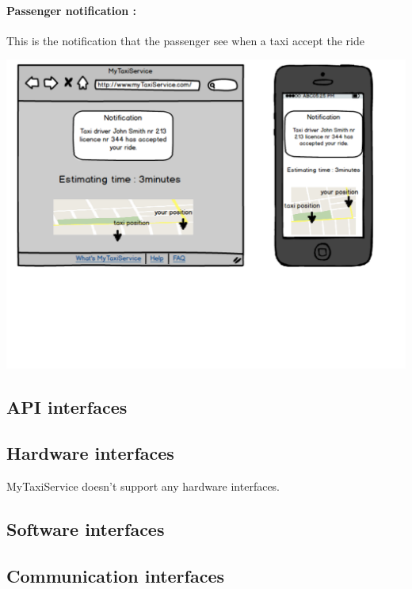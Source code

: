 \paragraph{Passenger notification :}
This is the notification that the passenger see when a taxi accept the ride
\begin{center}
	\includegraphics[width=\textwidth]{mockup/PassengerNotification.pdf}
\end{center}

\subsection{API interfaces}
\subsection{Hardware interfaces}
MyTaxiService doesn't support any hardware interfaces. 
\subsection{Software interfaces}
\subsection{Communication interfaces}

